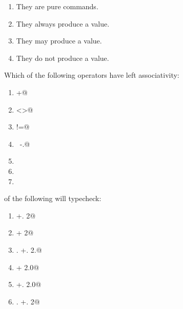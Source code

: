 \documentclass[addpoints,11pt]{exam}
\begin{document}
\begin{questions}
\begin{enumerate}
\item They are pure commands.
\item They always produce a value.
\item They may produce a value.
\item They do not produce a value.
\end{enumerate}\question Which of the following operators have left associativity:
\begin{enumerate}
\item \lstinline@+@
\item \lstinline@<>@
\item \lstinline@!=@
\item \lstinline@~-.@
\item \lstinline@mod@
\item \lstinline@lsr@
\item \lstinline@lnot@
\end{enumerate}
\question of the following will typecheck:
\begin{enumerate}
\item {} +. 2@
\item {} + 2@
\item {}. +. 2.@
\item {} + 2.0@
\item {} +. 2.0@
\item {}. +. 2@
\end{enumerate}\end{questions}
\end{document}
